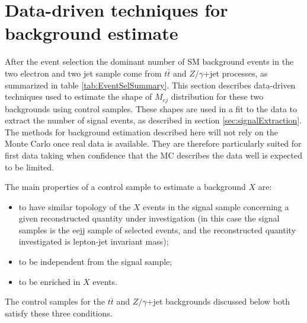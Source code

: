 % 

\section{Data-driven techniques for background estimate} \label{sec:bkgStudy}
After the event selection the dominant number of SM background events in the two electron and two jet sample come from $t\bar{t}$ and 
$Z/\gamma$+jet processes, as summarized in table \ref{tab:EventSelSummary}. 
This section describes data-driven techniques used to estimate the shape of $M_{ej}$ distribution for these two backgrounds using 
control samples. These shapes are used in a fit to the data to extract the number of signal events, as described 
in section \ref{sec:signalExtraction}. The methods for background estimation described here will not rely on the Monte Carlo 
once real data is available. They are
therefore particularly suited for first data taking when confidence that the MC describes
the data well is expected to be limited.

The main properties of a control sample to estimate a background $X$ are:
\begin{itemize}
%
\item to have similar topology of the $X$ events in the signal sample concerning a given reconstructed quantity 
under investigation (in this case the signal samples is the eejj sample of selected events, 
and the reconstructed quantity investigated is lepton-jet invariant mass);  
%
\item to be independent from the signal sample;
%
\item to be enriched in $X$ events.
%
\end{itemize}
%
The control samples for the $t\bar{t}$ and $Z/\gamma$+jet backgrounds discussed below both satisfy these three conditions.



